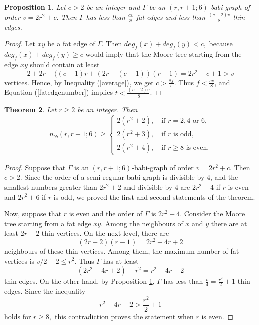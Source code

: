 \documentclass[a4paper,11pt]{article}
\newtheorem{theorem}{Theorem}[section]
\newtheorem{proposition}[theorem]{Proposition}
\begin{document}
\begin{proposition}
\label{estimatewith-c}
Let $c > 2$ be an integer and $\Gamma $ be an $(r,r+1;6)$-babi-graph
of order $v=2r^2+c.$ Then $\Gamma $ has less than $\frac{cv}{8}$ fat edges and
less than $\frac{(c-2)v}{8}$ thin edges.
\end{proposition}

\begin{proof}
Let $xy$ be a fat edge of $\Gamma $. Then $deg_f(x)+deg_f(y) < c,$ because 
$deg_f(x)+deg_f(y) \geq c$
would imply that the Moore tree starting from the edge $xy$ should contain 
at least
$$2+2r+((c-1)r+(2r-(c-1))(r-1)=2r^2+c+1>v$$
vertices. Hence, by Inequality (\ref{average}), we get $c >\frac{8f}{v}.$ Thus
$f < \frac{cv}{8}$, and Equation (\ref{fatedgenumber}) implies $t < \frac{(c-2)v}{8}$. 
\end{proof}


\begin{theorem}\label{lowergirth6}
Let $r\geq 2$ be an integer. Then 
$$n_{bb}(r,r+1;6)\geq
\begin{cases}
2(r^2+2), \quad\text{if $r=2,4$ or $6$,} \\
2(r^2+3), \quad\text{if $r$ is odd,} \\
2(r^2+4), \quad\text{if $r\geq 8$ is even.}
\end{cases}$$
\end{theorem}

\begin{proof}
Suppose that $\Gamma $ is an $(r,r+1;6)$-babi-graph
of order $v=2r^2+c$. Then $c>2$. Since the order of a semi-regular babi-graph is divisible by $4$,
and the smallest numbers greater than $2r^2+2$ and divisible by $4$ are $2r^2+4$ if $r$ is even
and $2r^2+6$ if $r$ is odd, we proved the first and second statements of the theorem. 
 
Now, suppose that $r$ is even and the order of $\Gamma $ is $2r^2+4$.
Consider the Moore tree starting from a fat edge $xy.$ Among the neighbours of $x$ and $y$ there are at least $2r-2$ thin vertices. On the next level, there are 
$$(2r-2)(r-1)=2r^2-4r+2$$
neighbours of these thin vertices. Among them, the maximum number of fat vertices is
$v/2-2\leq r^2.$ Thus $\Gamma $ has at least 
$$(2r^2-4r+2)-r^2=r^2-4r+2$$ 
thin edges. On the other hand, by Proposition \ref{estimatewith-c}, 
$\Gamma $ has less than $\frac{v}{4}=\frac{r^2}{2}+1$ thin edges. 
Since the inequality
$$r^2-4r+2>\frac{r^2}{2}+1$$
holds for $r\geq 8,$ this contradiction proves the statement when $r$ is even.
\end{proof}
 
\end{document}
